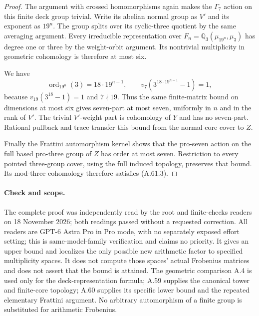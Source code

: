 \begin{proof}
The argument with crossed homomorphisms again
makes the $\Gamma_7$ action on this finite deck
group trivial.  Write its abelian normal group
as $V'$ and its exponent as $19^n$.  The group
splits over its cyclic-three quotient by the
same averaging argument.  Every irreducible
representation over
$F_n=\mathbb Q_3(\mu_{19^n},\mu_3)$ has degree
one or three by the weight-orbit argument.
Its nontrivial multiplicity in geometric
cohomology is therefore at most six.

We have
\[
 \operatorname{ord}_{19^n}(3)=18\cdot19^{n-1},
 \qquad v_7(3^{18\cdot19^{n-1}}-1)=1,                    \tag{A.61.7}
\]
because $v_{19}(3^{18}-1)=1$ and $7\nmid19$.
Thus the same finite-matrix bound on dimensions
at most six gives seven-part at most seven,
uniformly in $n$ and in the rank of $V'$.
The trivial $V'$-weight part is cohomology of
$Y$ and has no seven-part.  Rational pullback
and trace transfer this bound from the normal
core cover to $Z$.

Finally the Frattini automorphism kernel shows
that the pro-seven action on the full based
pro-three group of $Z$ has order at most seven.
Restriction to every pointed three-group cover,
using the full induced topology, preserves that
bound.  Its mod-three cohomology therefore
satisfies (A.61.3).
\end{proof}

\paragraph{Check and scope.}
The complete proof was independently read by the root
and finite-checks readers on 18 November 2026; both
readings passed without a requested correction.
All readers are GPT-6 Astra Pro in Pro mode, with
no separately exposed effort setting; this is
same-model-family verification and claims no priority.
It gives an upper bound and localizes the only possible
new arithmetic factor to specified multiplicity spaces.
It does not compute those spaces' actual Frobenius
matrices and does not assert that the bound is attained.
The geometric comparison A.4 is used only for the
deck-representation formula; A.59 supplies the canonical
tower and finite-core topology; A.60 supplies its
specific lower bound and the repeated elementary
Frattini argument.  No arbitrary automorphism of a
finite group is substituted for arithmetic Frobenius.
